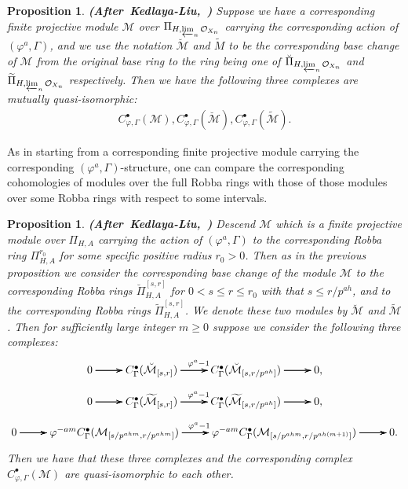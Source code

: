 \documentclass[12pt]{amsart}
\newtheorem{proposition}[theorem]{Proposition}
\theoremstyle{definition}
\numberwithin{equation}{section}
\begin{document}
\begin{proposition} \mbox{\bf{(After Kedlaya-Liu, \cite[Theorem 5.7.10]{KL16})}}
Suppose we have a corresponding finite projective module $\mathcal{M}$ over $\Pi_{H,\varprojlim_n\mathcal{O}_{X_n}}$ carrying the corresponding action of $(\varphi^a,\Gamma)$, and we use the notation $\breve{\mathcal{M}}$ and $\widetilde{M}$ to be the corresponding base change of $\mathcal{M}$ from the original base ring to the ring being one of $\breve{\Pi}_{H,\varprojlim_n\mathcal{O}_{X_n}}$ and $\widetilde{\Pi}_{H,\varprojlim_n\mathcal{O}_{X_n}}$ respectively. Then we have the following three complexes are mutually quasi-isomorphic:
\begin{align}
C_{\varphi,\Gamma}^\bullet(\mathcal{M}),C_{\varphi,\Gamma}^\bullet(\breve{\mathcal{M}}),C_{\varphi,\Gamma}^\bullet(\widetilde{\mathcal{M}}).
\end{align}

	
\end{proposition}



\indent As in \cite{KL16} starting from a corresponding finite projective module carrying the corresponding $(\varphi^a,\Gamma)$-structure, one can compare the corresponding cohomologies of modules over the full Robba rings with those of those modules over some Robba rings with respect to some intervals.





\begin{proposition}\mbox{\bf{(After Kedlaya-Liu, \cite[Theorem 5.7.11]{KL16})}}
Descend $\mathcal{M}$ which is a finite projective module over $\Pi_{H,A}$ carrying the action of $(\varphi^a,\Gamma)$ to the corresponding Robba ring $\Pi^{r_0}_{H,A}$ for some specific positive radius $r_0>0$. Then as in the previous proposition we consider the corresponding base change of the module $\mathcal{M}$ to the corresponding Robba rings $\breve{\Pi}^{[s,r]}_{H,A}$ for $0<s\leq r\leq r_0$ with that $s\leq r/p^{ah}$, and to the corresponding Robba rings $\widetilde{\Pi}^{[s,r]}_{H,A}$. We denote these two modules by $\breve{\mathcal{M}}$ and $\widetilde{\mathcal{M}}$. Then for sufficiently large integer $m\geq 0$ suppose we consider the following three complexes:
\[
\xymatrix@R+0pc@C+0pc{
0\ar[r] \ar[r] \ar[r] &C^\bullet_{\Gamma}(\breve{\mathcal{M}}_{[s,r]})\ar[r]^{\varphi^a-1} \ar[r] \ar[r]  &C^\bullet_{\Gamma}(\breve{\mathcal{M}}_{[s,r/p^{ah}]}) \ar[r] \ar[r] \ar[r]&0,
}
\]
\[
\xymatrix@R+0pc@C+0pc{
0\ar[r] \ar[r] \ar[r] &C^\bullet_{\Gamma}(\widetilde{\mathcal{M}}_{[s,r]})\ar[r]^{\varphi^a-1} \ar[r] \ar[r]  &C^\bullet_{\Gamma}(\widetilde{\mathcal{M}}_{[s,r/p^{ah}]}) \ar[r] \ar[r] \ar[r]&0,
}
\]
\[
\xymatrix@R+0pc@C+0pc{
0\ar[r] \ar[r] \ar[r] &\varphi^{-am}C^\bullet_{\Gamma}(\mathcal{M}_{[s/p^{ahm},r/p^{ahm}]})\ar[r]^{\varphi^a-1} \ar[r] \ar[r]  &\varphi^{-am}C^\bullet_{\Gamma}(\mathcal{M}_{[s/p^{ahm},r/p^{ah(m+1)}]}) \ar[r] \ar[r] \ar[r]&0.
}
\]
Then we have that these three complexes and the corresponding complex $C^\bullet_{\varphi,\Gamma}(\mathcal{M})$ are quasi-isomorphic to each other.	
\end{proposition}
\end{document}
